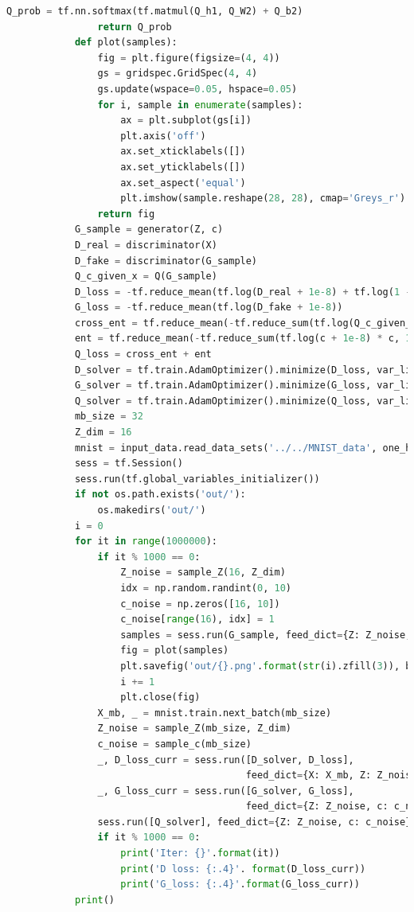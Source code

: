 \begin{lstlisting}[language = Python]
                Q_prob = tf.nn.softmax(tf.matmul(Q_h1, Q_W2) + Q_b2)
                return Q_prob
            def plot(samples):
                fig = plt.figure(figsize=(4, 4))
                gs = gridspec.GridSpec(4, 4)
                gs.update(wspace=0.05, hspace=0.05)
                for i, sample in enumerate(samples):
                    ax = plt.subplot(gs[i])
                    plt.axis('off')
                    ax.set_xticklabels([])
                    ax.set_yticklabels([])
                    ax.set_aspect('equal')
                    plt.imshow(sample.reshape(28, 28), cmap='Greys_r')
                return fig
            G_sample = generator(Z, c)
            D_real = discriminator(X)
            D_fake = discriminator(G_sample)
            Q_c_given_x = Q(G_sample)
            D_loss = -tf.reduce_mean(tf.log(D_real + 1e-8) + tf.log(1 - D_fake + 1e-8))
            G_loss = -tf.reduce_mean(tf.log(D_fake + 1e-8))
            cross_ent = tf.reduce_mean(-tf.reduce_sum(tf.log(Q_c_given_x + 1e-8) * c, 1))
            ent = tf.reduce_mean(-tf.reduce_sum(tf.log(c + 1e-8) * c, 1))
            Q_loss = cross_ent + ent
            D_solver = tf.train.AdamOptimizer().minimize(D_loss, var_list=theta_D)
            G_solver = tf.train.AdamOptimizer().minimize(G_loss, var_list=theta_G)
            Q_solver = tf.train.AdamOptimizer().minimize(Q_loss, var_list=theta_G + theta_Q)
            mb_size = 32
            Z_dim = 16
            mnist = input_data.read_data_sets('../../MNIST_data', one_hot=True)
            sess = tf.Session()
            sess.run(tf.global_variables_initializer())
            if not os.path.exists('out/'):
                os.makedirs('out/')
            i = 0
            for it in range(1000000):
                if it % 1000 == 0:
                    Z_noise = sample_Z(16, Z_dim)
                    idx = np.random.randint(0, 10)
                    c_noise = np.zeros([16, 10])
                    c_noise[range(16), idx] = 1
                    samples = sess.run(G_sample, feed_dict={Z: Z_noise, c: c_noise})
                    fig = plot(samples)
                    plt.savefig('out/{}.png'.format(str(i).zfill(3)), bbox_inches='tight')
                    i += 1
                    plt.close(fig)
                X_mb, _ = mnist.train.next_batch(mb_size)
                Z_noise = sample_Z(mb_size, Z_dim)
                c_noise = sample_c(mb_size)
                _, D_loss_curr = sess.run([D_solver, D_loss],
                                          feed_dict={X: X_mb, Z: Z_noise, c: c_noise})
                _, G_loss_curr = sess.run([G_solver, G_loss],
                                          feed_dict={Z: Z_noise, c: c_noise})
                sess.run([Q_solver], feed_dict={Z: Z_noise, c: c_noise})
                if it % 1000 == 0:
                    print('Iter: {}'.format(it))
                    print('D loss: {:.4}'. format(D_loss_curr))
                    print('G_loss: {:.4}'.format(G_loss_curr))
            print()
            \end{lstlisting}
